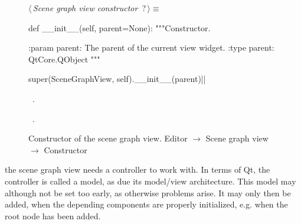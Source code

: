 \documentclass[%
    a4paper,    %
    justified,  %
    nobib,      %
    openany     %
]{tufte-book}
\begin{document}
\begin{figure}
\begin{flushleft} \small
\begin{minipage}{\linewidth}\label{scrap41}\raggedright\small
{} $\langle\,${\itshape Scene graph view constructor}\nobreak\ {\footnotesize {?}}$\,\rangle\equiv$
\vspace{-1ex}
\begin{pythoncode}
def __init__(self, parent=None):
    """Constructor.

    :param parent: The parent of the current view widget.
    :type parent:  QtCore.QObject
    """

    super(SceneGraphView, self).__init__(parent)|\NWsep|
\end{pythoncode}
\vspace{1.5ex}
\footnotesize
\begin{list}{}{\setlength{\itemsep}{-\parsep}\setlength{\itemindent}{-\leftmargin}}
\item \NWtxtMacroDefBy\ .
\item \NWtxtMacroRefIn\ .

\item{}
\end{list}
\end{minipage}\vspace{4ex}
\end{flushleft}
\caption{Constructor of the scene graph view.
  \newline{}\newline{}Editor $\rightarrow$ Scene graph view
  $\rightarrow$ Constructor}
\label{editor:lst:scene-graph-view:constructor}
\end{figure}

 the scene graph view needs a
controller to work with. In terms of Qt, the controller is called a model, as
due its model/view architecture. This model may although not be set too early,
as otherwise problems arise. It may only then be added, when the depending
components are properly initialized, e.g. when the root node has been added.
\end{document}
